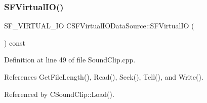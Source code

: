 \subsubsection{\texorpdfstring{S\+F\+Virtual\+I\+O()}{SFVirtualIO()}}
{\footnotesize\ttfamily S\+F\+\_\+\+V\+I\+R\+T\+U\+A\+L\+\_\+\+IO C\+S\+F\+Virtual\+I\+O\+Data\+Source\+::\+S\+F\+Virtual\+IO (\begin{DoxyParamCaption}{ }\end{DoxyParamCaption}) const}



Definition at line 49 of file Sound\+Clip.\+cpp.



References Get\+File\+Length(), Read(), Seek(), Tell(), and Write().



Referenced by C\+Sound\+Clip\+::\+Load().


